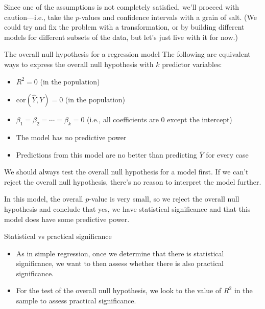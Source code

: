 \documentclass{beamer}\usepackage[]{graphicx}\usepackage[]{color}
\begin{document}
\begin{darkframes}
    \begin{frame}
      \begin{center}
        Since one of the assumptions is not completely satisfied, we'll proceed with caution---i.e., take the $p$-values and confidence intervals with a grain of salt.  (We could try and fix the problem with a transformation, or by building different models for different subsets of the data, but let's just live with it for now.)
      \end{center}
    \end{frame}

    \begin{frame}{The overall null hypothesis for a regression model}
      The following are equivalent ways to express the overall null hypothesis with $k$ predictor variables:
      \begin{itemize}[<+->]
        \item $R^2=0$ (in the population)
        \item $\text{cor}(\hat Y,Y)=0$ (in the population)
        \item $\beta_1=\beta_2=\cdots=\beta_k=0$ (i.e., all coefficients are 0 except the intercept)
        \item The model has no predictive power
        \item Predictions from this model are no better than predicting $\overline Y$ for every case
      \end{itemize}
    \end{frame}

    \begin{frame}
      We should always test the overall null hypothesis for a model first. \alert{If we can't reject the overall null hypothesis, there's no reason to interpret the model further.}

      \bigskip\pause

      In this model, the overall $p$-value is very small, so we reject the overall null hypothesis and conclude that yes, we have statistical significance and that this model does have some predictive power.
    \end{frame}

    \begin{frame}{Statistical vs practical significance}
      \begin{itemize}
        \item As in simple regression, once we determine that there is statistical significance, we want to then assess whether there is also practical significance.
        \item For the test of the overall null hypothesis, we look to the value of $R^2$ in the sample to assess practical significance.
      \end{itemize}
    \end{frame}


\end{darkframes}
\end{document}
